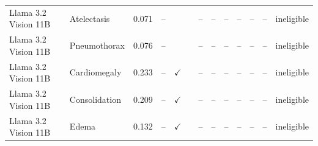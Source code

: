 \begin{longtable}{llrrccrrrrrll}
Llama 3.2 Vision 11B & Atelectasis & 0.071 & -- &  & & -- & -- & -- & -- & -- & -- & ineligible \\
Llama 3.2 Vision 11B & Pneumothorax & 0.076 & -- &  & & -- & -- & -- & -- & -- & -- & ineligible \\
Llama 3.2 Vision 11B & Cardiomegaly & 0.233 & -- & $\checkmark$ & & -- & -- & -- & -- & -- & -- & ineligible \\
Llama 3.2 Vision 11B & Consolidation & 0.209 & -- & $\checkmark$ & & -- & -- & -- & -- & -- & -- & ineligible \\
Llama 3.2 Vision 11B & Edema & 0.132 & -- & $\checkmark$ & & -- & -- & -- & -- & -- & -- & ineligible \\
\end{longtable}
\normalsize
